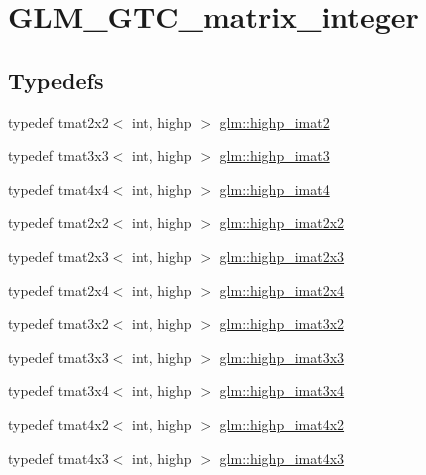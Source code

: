 \hypertarget{group__gtc__matrix__integer}{\section{G\-L\-M\-\_\-\-G\-T\-C\-\_\-matrix\-\_\-integer}
\label{group__gtc__matrix__integer}
}
\subsection*{Typedefs}
\begin{DoxyCompactItemize}
\item 
typedef tmat2x2$<$ int, highp $>$ \hyperlink{group__gtc__matrix__integer_gae1cd6ff099593d2f215bd4ceed538200}{glm\-::highp\-\_\-imat2}
\item 
typedef tmat3x3$<$ int, highp $>$ \hyperlink{group__gtc__matrix__integer_ga0766d11d0154f42893ef0912ab7c6a2c}{glm\-::highp\-\_\-imat3}
\item 
typedef tmat4x4$<$ int, highp $>$ \hyperlink{group__gtc__matrix__integer_gaa5eedcb20883541c3f7f2862cbd0b446}{glm\-::highp\-\_\-imat4}
\item 
typedef tmat2x2$<$ int, highp $>$ \hyperlink{group__gtc__matrix__integer_gab4411f2d106d24a32aaa3cb711dc8510}{glm\-::highp\-\_\-imat2x2}
\item 
typedef tmat2x3$<$ int, highp $>$ \hyperlink{group__gtc__matrix__integer_ga6c1a5f4d85de3f7eccb394970320bafc}{glm\-::highp\-\_\-imat2x3}
\item 
typedef tmat2x4$<$ int, highp $>$ \hyperlink{group__gtc__matrix__integer_gae7502957eb2ab9268726d87389ae2b55}{glm\-::highp\-\_\-imat2x4}
\item 
typedef tmat3x2$<$ int, highp $>$ \hyperlink{group__gtc__matrix__integer_ga2c8dc817124f44bc01f27777bfce983b}{glm\-::highp\-\_\-imat3x2}
\item 
typedef tmat3x3$<$ int, highp $>$ \hyperlink{group__gtc__matrix__integer_gaecb62c11fb25aadbb7eecc2da226d444}{glm\-::highp\-\_\-imat3x3}
\item 
typedef tmat3x4$<$ int, highp $>$ \hyperlink{group__gtc__matrix__integer_gabcd2d8d764b11db413259ee5cafd8446}{glm\-::highp\-\_\-imat3x4}
\item 
typedef tmat4x2$<$ int, highp $>$ \hyperlink{group__gtc__matrix__integer_ga7b936ac315e12b546d2597a4bffee4a1}{glm\-::highp\-\_\-imat4x2}
\item 
typedef tmat4x3$<$ int, highp $>$ \hyperlink{group__gtc__matrix__integer_ga28e21d3fe05d8476402e27081150cade}{glm\-::highp\-\_\-imat4x3}

\end{DoxyCompactItemize}
